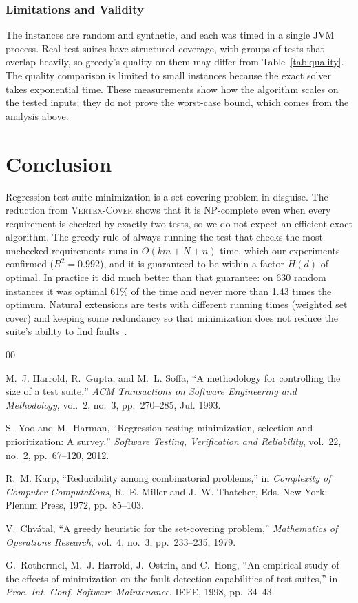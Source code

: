 \documentclass[conference]{IEEEtran}
\theoremstyle{definition}
\theoremstyle{remark}
\newcommand{\VC}{\textsc{Vertex-Cover}}
\begin{document}
\subsubsection{Limitations and Validity}
The instances are random and synthetic, and each was timed in a single JVM
process. Real test suites have structured coverage, with groups of tests that
overlap heavily, so greedy's quality on them may differ from
Table~\ref{tab:quality}. The quality comparison is limited to small instances
because the exact solver takes exponential time. These measurements show how
the algorithm scales on the tested inputs; they do not prove the worst-case
bound, which comes from the analysis above.

\section{Conclusion}
Regression test-suite minimization is a set-covering problem in disguise. The
reduction from \VC{} shows that it is NP-complete even when every requirement is
checked by exactly two tests, so we do not expect an efficient exact algorithm.
The greedy rule of always running the test that checks the most unchecked
requirements runs in $O(km + N + n)$ time, which our experiments confirmed
($R^2 = 0.992$), and it is guaranteed to be within a factor $H(d)$ of optimal.
In practice it did much better than that guarantee: on 630 random instances it
was optimal 61\% of the time and never more than 1.43 times the optimum.
Natural extensions are tests with different running times (weighted set cover)
and keeping some redundancy so that minimization does not reduce the suite's
ability to find faults~\cite{rothermel1998}.

\begin{thebibliography}{00}

 M.~J. Harrold, R.~Gupta, and M.~L. Soffa, ``A methodology
for controlling the size of a test suite,'' \emph{ACM Transactions on Software
Engineering and Methodology}, vol.~2, no.~3, pp.~270--285, Jul. 1993.

 S.~Yoo and M.~Harman, ``Regression testing minimization,
selection and prioritization: A survey,'' \emph{Software Testing, Verification
and Reliability}, vol.~22, no.~2, pp.~67--120, 2012.

 R.~M. Karp, ``Reducibility among combinatorial problems,'' in
\emph{Complexity of Computer Computations}, R.~E. Miller and J.~W. Thatcher,
Eds. New York: Plenum Press, 1972, pp.~85--103.

 V.~Chv{\'a}tal, ``A greedy heuristic for the set-covering
problem,'' \emph{Mathematics of Operations Research}, vol.~4, no.~3,
pp.~233--235, 1979.

 G.~Rothermel, M.~J. Harrold, J.~Ostrin, and C.~Hong,
``An empirical study of the effects of minimization on the fault detection
capabilities of test suites,'' in \emph{Proc. Int. Conf. Software
Maintenance}. IEEE, 1998, pp.~34--43.

\end{thebibliography}
\end{document}
